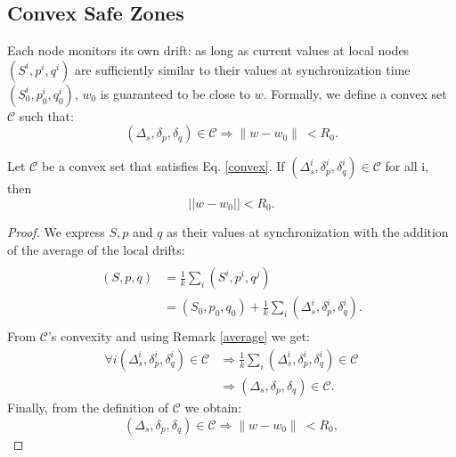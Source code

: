 \subsection{Convex Safe Zones}
Each node monitors its own drift: as long as current values
at local nodes $(S^i,p^i,q^i)$ are sufficiently similar to their values
at synchronization time $(S^i_0,p^i_0,q^i_0)$, $w_0$ is guaranteed to be close to $w$.
Formally, we define a convex set $\mathcal{C}$ such that:
\begin{equation} \label{convex}
(\Delta_s, \delta_p, \delta_q) \in \mathcal{C} \Rightarrow \parallel w-w_0
\parallel \ < R_0.
\end{equation}
\begin{lemma}
Let $\mathcal{C}$ be a convex set that satisfies Eq. \ref{convex}.
If $(\Delta_s^i, \delta_p^i, \delta_q^i) \in \mathcal{C}$ for all i, then
\begin{equation*}
||w-w_0|| < R_0.
\end{equation*}
\end{lemma}
\begin{proof}
We express $S, p$ and $q$ as their values at synchronization with the addition of the
average of the local drifts:
\begin{equation}
\begin{split}
\\(S,p,q) & = \frac{1}{k} \sum_i (S^i,p^i,q^j) \\
 & = (S_0,p_0,q_0) + \frac{1}{k} \sum_i (\Delta_s^i,\delta^i_p,\delta_q^i). \\
\end{split}
\end{equation}
From $\mathcal{C}$'s convexity and using Remark \ref{average} we get:
\begin{equation}
\begin{split}
\forall i (\Delta_s^i,\delta^i_p,\delta_q^i) \in \mathcal{C} & \Rightarrow
\frac{1}{k} \sum_i (\Delta_s^i,\delta^i_p,\delta_q^i) \in \mathcal{C} \\
& \Rightarrow (\Delta_s,\delta_p,\delta_q) \in \mathcal{C}.
\end{split}
\end{equation}
Finally, from the definition of $\mathcal{C}$ we obtain:
\begin{equation}
(\Delta_s,\delta_p,\delta_q) \in \mathcal{C} \Rightarrow \parallel w-w_0
\parallel \ < R_0,
\end{equation}
\end{proof}

